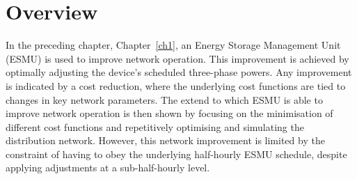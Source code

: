 \section{Overview}
\label{ch2:sec:overview}



In the preceding chapter, Chapter~\ref{ch1}, an Energy Storage Management Unit (ESMU) is used to improve network operation.
This improvement is achieved by optimally adjusting the device's scheduled three-phase powers.
Any improvement is indicated by a cost reduction, where the underlying cost functions are tied to changes in key network parameters.
The extend to which ESMU is able to improve network operation is then shown by focusing on the minimisation of different cost functions and repetitively optimising and simulating the distribution network.
However, this network improvement is limited by the constraint of having to obey the underlying half-hourly ESMU schedule, despite applying adjustments at a sub-half-hourly level.

